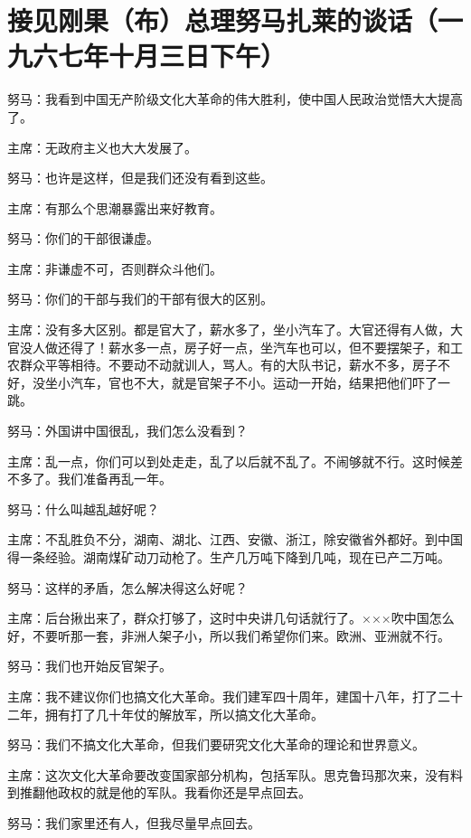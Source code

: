 \section[接见刚果（布）总理努马扎莱的谈话（一九六七年十月三日下午）]{接见刚果（布）总理努马扎莱的谈话（一九六七年十月三日下午）}


努马：我看到中国无产阶级文化大革命的伟大胜利，使中国人民政治觉悟大大提高了。

主席：无政府主义也大大发展了。

努马：也许是这样，但是我们还没有看到这些。

主席：有那么个思潮暴露出来好教育。

努马：你们的干部很谦虚。

主席：非谦虚不可，否则群众斗他们。

努马：你们的干部与我们的干部有很大的区别。

主席：没有多大区别。都是官大了，薪水多了，坐小汽车了。大官还得有人做，大官没人做还得了！薪水多一点，房子好一点，坐汽车也可以，但不要摆架子，和工农群众平等相待。不要动不动就训人，骂人。有的大队书记，薪水不多，房子不好，没坐小汽车，官也不大，就是官架子不小。运动一开始，结果把他们吓了一跳。

努马：外国讲中国很乱，我们怎么没看到？

主席：乱一点，你们可以到处走走，乱了以后就不乱了。不闹够就不行。这时候差不多了。我们准备再乱一年。

努马：什么叫越乱越好呢？

主席：不乱胜负不分，湖南、湖北、江西、安徽、浙江，除安徽省外都好。到中国得一条经验。湖南煤矿动刀动枪了。生产几万吨下降到几吨，现在已产二万吨。

努马：这样的矛盾，怎么解决得这么好呢？

主席：后台揪出来了，群众打够了，这时中央讲几句话就行了。×××吹中国怎么好，不要听那一套，非洲人架子小，所以我们希望你们来。欧洲、亚洲就不行。

努马：我们也开始反官架子。

主席：我不建议你们也搞文化大革命。我们建军四十周年，建国十八年，打了二十二年，拥有打了几十年仗的解放军，所以搞文化大革命。

努马：我们不搞文化大革命，但我们要研究文化大革命的理论和世界意义。

主席：这次文化大革命要改变国家部分机构，包括军队。思克鲁玛那次来，没有料到推翻他政权的就是他的军队。我看你还是早点回去。

努马：我们家里还有人，但我尽量早点回去。


